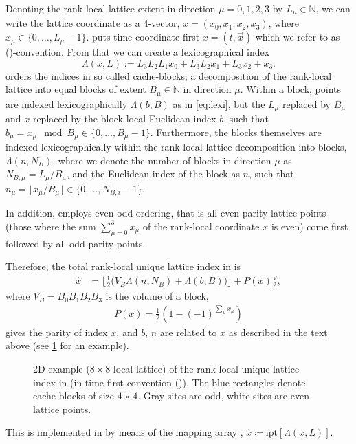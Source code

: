 Denoting the rank-local lattice extent in direction $\mu=0,1,2,3$ by $L_\mu \in \mathbb{N}$, we can write the lattice coordinate as a 4-vector, $x = (x_0,x_1,x_2,x_3)$, where $x_\mu \in \{ 0, \dots, L_\mu -1 \}$. \Openqxd puts time coordinate first $x = (t, \vec{x})$ which we refer to as (\txyz)-convention. From that we can create a lexicographical index
\begin{equation} \label{eq:lexi}
\Lambda(x, L) := L_3 L_2 L_1 x_0 + L_3 L_2 x_1 + L_3 x_2 + x_3.
\end{equation}
\Openqxd orders the indices in so called cache-blocks; a decomposition of the rank-local lattice into equal blocks of extent $B_\mu \in \mathbb{N}$ in direction $\mu$. Within a block, points are indexed lexicographically $\Lambda(b, B)$ as in \cref{eq:lexi}, but the $L_\mu$ replaced by $B_\mu$ and $x$ replaced by the block local Euclidean index $b$, such that $b_\mu = x_\mu \mod B_\mu \in \{ 0, \dots, B_\mu -1 \}$.
Furthermore, the blocks themselves are indexed lexicographically within the rank-local lattice decomposition into blocks, \ie $\Lambda(n, N_B)$, where we denote the number of blocks in direction $\mu$ as $N_{B,\mu} = L_\mu / B_\mu$, and the Euclidean index of the block as $n$, such that $n_\mu = \lfloor x_\mu / B_\mu \rfloor \in \{ 0, \dots, N_{B,i} -1 \}$.

In addition, \openqxd employs even-odd ordering, that is all even-parity lattice points (those where the sum $\sum_{\mu=0}^3 x_\mu$ of the rank-local coordinate $x$ is even) come first followed by all odd-parity points.

Therefore, the total rank-local unique lattice index in \openqxd is
\begin{align} \label{eq:openqcd:ipt}
\hat{x} &= \biggl \lfloor \frac{1}{2} \Big( V_B \Lambda(n, N_B) + \Lambda(b, B) \Big) \biggr \rfloor + P(x) \frac{V}{2},
\end{align}
where $V_B = B_0 B_1 B_2 B_3$ is the volume of a block,
\begin{align} \label{eq:parity}
P(x)=\tfrac{1}{2}(1-(-1)^{\sum_\mu x_\mu})
\end{align}
gives the parity of index $x$, and $b$, $n$ are related to $x$ as described in the text above (see \cref{fig:index} for an example).
\begin{figure}
  \caption{2D example ($8 \times 8$ local lattice) of the rank-local unique lattice index in \openqxd (in time-first convention (\txyz)). The blue rectangles denote cache blocks of size $4 \times 4$. Gray sites are odd, white sites are even lattice points.}
  \label{fig:index}
\end{figure}
This is implemented in \openqxd by means of the mapping array , $\hat{x} \coloneqq \text{ipt}\left[\Lambda(x,L)\right]$.

